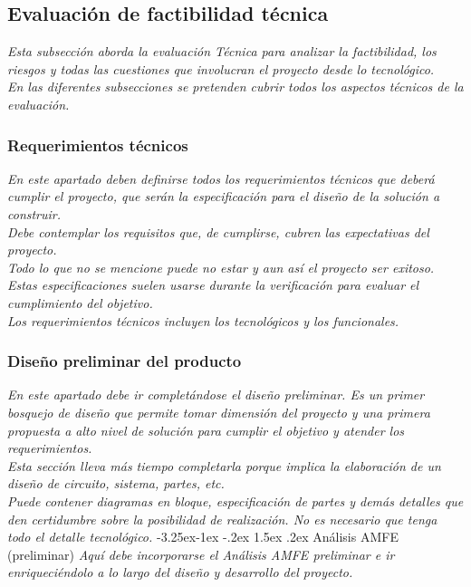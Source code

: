 \documentclass[12pt]{article}
\makeatletter
\renewcommand\paragraph{\@startsection{paragraph}{4}{\z@}%
                                     {-3.25ex\@plus -1ex \@minus -.2ex}%
                                     {1.5ex \@plus .2ex}%
                                     {\normalfont\normalsize\bfseries}}
\makeatother
\begin{document}
\subsection{Evaluación de factibilidad técnica}
{\it
Esta subsección aborda la evaluación Técnica para analizar la factibilidad, los riesgos y todas las cuestiones que involucran el proyecto desde lo tecnológico.\\
En las diferentes subsecciones se pretenden cubrir todos los aspectos técnicos de la evaluación.
}

\subsubsection{Requerimientos técnicos}
{\it
En este apartado deben definirse todos los requerimientos técnicos que deberá cumplir el proyecto, que serán la especificación para el diseño de la solución a construir.\\
Debe contemplar los requisitos que, de cumplirse, cubren las expectativas del proyecto.\\
Todo lo que no se mencione puede no estar y aun así el proyecto ser exitoso.\\
Estas especificaciones suelen usarse durante la verificación para evaluar el cumplimiento del objetivo.\\
Los requerimientos técnicos incluyen los tecnológicos y los funcionales.
}

\subsubsection{Diseño preliminar del producto}
{\it
En este apartado debe ir completándose el diseño preliminar. Es un primer bosquejo de diseño que permite tomar dimensión del proyecto y una primera propuesta a alto nivel de solución para cumplir el objetivo y atender los requerimientos.\\
Esta sección lleva más tiempo completarla porque implica la elaboración de un diseño de circuito, sistema, partes, etc.\\
Puede contener diagramas en bloque, especificación de partes y demás detalles que den certidumbre sobre la posibilidad de realización. No es necesario que tenga todo el detalle tecnológico.
}
    \paragraph{Análisis AMFE (preliminar)}
    {\it
    Aquí debe incorporarse el Análisis AMFE preliminar e ir enriqueciéndolo a lo largo del diseño y desarrollo del proyecto.
    }
\end{document}

